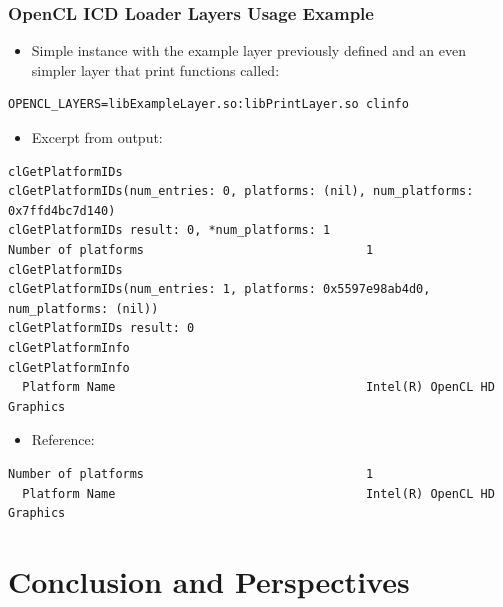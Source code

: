 \documentclass[
    ignorenonframetext,
  ]{beamer}
\begin{document}
\begin{frame}[fragile]
  \frametitle{OpenCL ICD Loader Layers Usage Example}
\begin{itemize}
\item Simple instance with the example layer previously defined and an even simpler
      layer that print functions called:
\end{itemize}
\tiny
\begin{verbatim}
OPENCL_LAYERS=libExampleLayer.so:libPrintLayer.so clinfo
\end{verbatim}
\normalsize
\begin{itemize}
\item Excerpt from output:
\end{itemize}
\tiny
\begin{verbatim}
clGetPlatformIDs
clGetPlatformIDs(num_entries: 0, platforms: (nil), num_platforms: 0x7ffd4bc7d140)
clGetPlatformIDs result: 0, *num_platforms: 1
Number of platforms                               1
clGetPlatformIDs
clGetPlatformIDs(num_entries: 1, platforms: 0x5597e98ab4d0, num_platforms: (nil))
clGetPlatformIDs result: 0
clGetPlatformInfo
clGetPlatformInfo
  Platform Name                                   Intel(R) OpenCL HD Graphics
\end{verbatim}
\normalsize
\begin{itemize}
\item Reference:
\end{itemize}
\tiny
\begin{verbatim}
Number of platforms                               1
  Platform Name                                   Intel(R) OpenCL HD Graphics
\end{verbatim}
\end{frame}

\section[Conclusion]{Conclusion and Perspectives}


\end{document}
